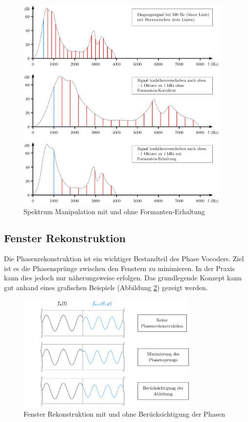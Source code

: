 \begin{figure}
    \centering
    \includegraphics[width=0.95\textwidth]{papers/autotune/images/Formanten-Erhaltung.pdf}
    \caption{Spektrum Manipulation mit und ohne Formanten-Erhaltung}
    \label{autotune:fig:formantenErhaltung}
\end{figure}



\subsection{Fenster Rekonstruktion
\label{autotune:subsection:fensterRekonstruktion}}
Die Phasenrekonstruktion ist ein wichtiger Bestandteil des Phase Vocoders.
Ziel ist es die Phasensprünge zwischen den Fenstern zu minimieren.
In der Praxis kann dies jedoch nur näherungsweise erfolgen.
Das grundlegende Konzept kann gut anhand eines grafischen Beispiels (Abbildung \ref{autotune:fig:phaseReconstruction}) gezeigt werden.
\begin{figure}
    \centering
    \includegraphics[width=0.8\textwidth]{papers/autotune/images/Fenster-Rekonstruktion.pdf}
    \caption{Fenster Rekonstruktion mit und ohne Berücksichtigung der Phasen}
    \label{autotune:fig:phaseReconstruction}
\end{figure}

